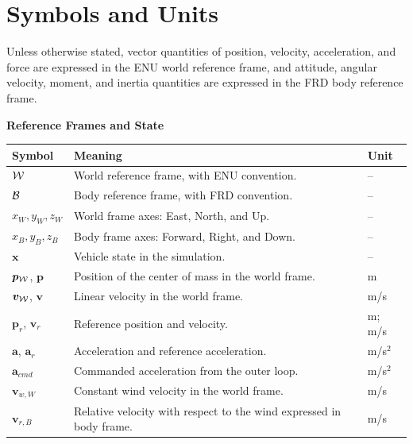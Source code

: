 \clearpage
\begingroup
\pagestyle{empty}
\thispagestyle{empty}
\section*{Symbols and Units}

\hypersetup{allcolors=black}
\setlength{\parindent}{0cm}
\renewcommand{\arraystretch}{1.06}\begin{singlespace}
Unless otherwise stated, vector quantities of position, velocity, acceleration, and force are expressed in the ENU world reference frame, and attitude, angular velocity, moment, and inertia quantities are expressed in the FRD body reference frame.

\newcommand{\simbolosbloque}[1]{%
  \vspace{0.7em}\noindent\textbf{#1}\par\vspace{0.2em}%
}
\newcommand{\cabeceratablasimbolos}{%
  \toprule
  \textbf{Symbol} & \textbf{Meaning} & \textbf{Unit} \\
  \midrule
}

\simbolosbloque{Reference Frames and State}
\footnotesize
\begin{tabularx}{\textwidth}{@{}>{\raggedright\arraybackslash}p{}>{\raggedright\arraybackslash}X>{\raggedright\arraybackslash}p{}@{}}
\cabeceratablasimbolos
$\mathcal{W}$ & World reference frame, with ENU convention. & -- \\
$\mathcal{B}$ & Body reference frame, with FRD convention. & -- \\
$x_W,y_W,z_W$ & World frame axes: East, North, and Up. & -- \\
$x_B,y_B,z_B$ & Body frame axes: Forward, Right, and Down. & -- \\
$\bm{x}$ & Vehicle state in the simulation. & -- \\
$\bm{p}_{\mathcal{W}}$, $\bm{p}$ & Position of the center of mass in the world frame. & m \\
$\bm{v}_{\mathcal{W}}$, $\bm{v}$ & Linear velocity in the world frame. & m/s \\
$\bm{p}_r$, $\bm{v}_r$ & Reference position and velocity. & m; m/s \\
$\bm{a}$, $\bm{a}_r$ & Acceleration and reference acceleration. & m/s$^2$ \\
$\bm{a}_{cmd}$ & Commanded acceleration from the outer loop. & m/s$^2$ \\
$\bm{v}_{w,W}$ & Constant wind velocity in the world frame. & m/s \\
$\bm{v}_{r,B}$ & Relative velocity with respect to the wind expressed in body frame. & m/s \\
\bottomrule
\end{tabularx}
\normalsize


\end{singlespace}
